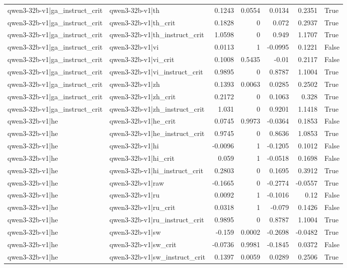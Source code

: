 \begin{table}
\begin{tabular}{l l r r r r l}
qwen3-32b-v1|ga_instruct_crit & qwen3-32b-v1|th & 0.1243 & 0.0554 & 0.0134 & 0.2351 & True \\
qwen3-32b-v1|ga_instruct_crit & qwen3-32b-v1|th_crit & 0.1828 & 0 & 0.072 & 0.2937 & True \\
qwen3-32b-v1|ga_instruct_crit & qwen3-32b-v1|th_instruct_crit & 1.0598 & 0 & 0.949 & 1.1707 & True \\
qwen3-32b-v1|ga_instruct_crit & qwen3-32b-v1|vi & 0.0113 & 1 & -0.0995 & 0.1221 & False \\
qwen3-32b-v1|ga_instruct_crit & qwen3-32b-v1|vi_crit & 0.1008 & 0.5435 & -0.01 & 0.2117 & False \\
qwen3-32b-v1|ga_instruct_crit & qwen3-32b-v1|vi_instruct_crit & 0.9895 & 0 & 0.8787 & 1.1004 & True \\
qwen3-32b-v1|ga_instruct_crit & qwen3-32b-v1|zh & 0.1393 & 0.0063 & 0.0285 & 0.2502 & True \\
qwen3-32b-v1|ga_instruct_crit & qwen3-32b-v1|zh_crit & 0.2172 & 0 & 0.1063 & 0.328 & True \\
qwen3-32b-v1|ga_instruct_crit & qwen3-32b-v1|zh_instruct_crit & 1.031 & 0 & 0.9201 & 1.1418 & True \\
qwen3-32b-v1|he & qwen3-32b-v1|he_crit & 0.0745 & 0.9973 & -0.0364 & 0.1853 & False \\
qwen3-32b-v1|he & qwen3-32b-v1|he_instruct_crit & 0.9745 & 0 & 0.8636 & 1.0853 & True \\
qwen3-32b-v1|he & qwen3-32b-v1|hi & -0.0096 & 1 & -0.1205 & 0.1012 & False \\
qwen3-32b-v1|he & qwen3-32b-v1|hi_crit & 0.059 & 1 & -0.0518 & 0.1698 & False \\
qwen3-32b-v1|he & qwen3-32b-v1|hi_instruct_crit & 0.2803 & 0 & 0.1695 & 0.3912 & True \\
qwen3-32b-v1|he & qwen3-32b-v1|raw & -0.1665 & 0 & -0.2774 & -0.0557 & True \\
qwen3-32b-v1|he & qwen3-32b-v1|ru & 0.0092 & 1 & -0.1016 & 0.12 & False \\
qwen3-32b-v1|he & qwen3-32b-v1|ru_crit & 0.0318 & 1 & -0.079 & 0.1426 & False \\
qwen3-32b-v1|he & qwen3-32b-v1|ru_instruct_crit & 0.9895 & 0 & 0.8787 & 1.1004 & True \\
qwen3-32b-v1|he & qwen3-32b-v1|sw & -0.159 & 0.0002 & -0.2698 & -0.0482 & True \\
qwen3-32b-v1|he & qwen3-32b-v1|sw_crit & -0.0736 & 0.9981 & -0.1845 & 0.0372 & False \\
qwen3-32b-v1|he & qwen3-32b-v1|sw_instruct_crit & 0.1397 & 0.0059 & 0.0289 & 0.2506 & True \\

\end{tabular}
\end{table}
